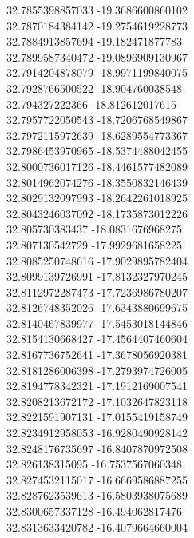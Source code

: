 {32.7855398857033	-19.3686600860102\\
32.7870184384142	-19.2754619228773\\
32.7884913857694	-19.182471877783\\
32.7899587340472	-19.0896909130967\\
32.7914204878079	-18.9971199840075\\
32.7928766500522	-18.904760038548\\
32.794327222366	-18.812612017615\\
32.7957722050543	-18.7206768549867\\
32.7972115972639	-18.6289554773367\\
32.7986453970965	-18.5374488042455\\
32.8000736017126	-18.4461577482089\\
32.8014962074276	-18.3550832146439\\
32.8029132097993	-18.2642261018925\\
32.8043246037092	-18.1735873012226\\
32.805730383437	-18.0831676968275\\
32.807130542729	-17.9929681658225\\
32.8085250748616	-17.9029895782404\\
32.8099139726991	-17.8132327970245\\
32.8112972287473	-17.7236986780207\\
32.8126748352026	-17.6343880699675\\
32.8140467839977	-17.5453018144846\\
32.8154130668427	-17.4564407460604\\
32.8167736752641	-17.3678056920381\\
32.8181286006398	-17.2793974726005\\
32.8194778342321	-17.1912169007541\\
32.8208213672172	-17.1032647823118\\
32.8221591907131	-17.0155419158749\\
32.8234912958053	-16.9280490928142\\
32.8248176735697	-16.8407870972508\\
32.826138315095	-16.7537567060348\\
32.8274532115017	-16.6669586887255\\
32.8287623539613	-16.5803938075689\\
32.8300657337128	-16.494062817476\\
32.8313633420782	-16.4079664660004\\
}
